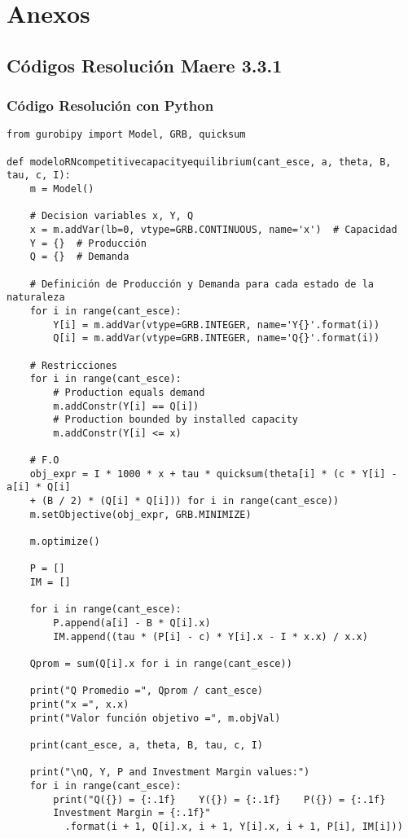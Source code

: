 
\chapter{Anexos}
\label{}

\section{Códigos Resolución Maere 3.3.1}

\subsection{Código Resolución con Python}\label{codigoPhyton}
\begin{footnotesize}
\begin{lstlisting}
from gurobipy import Model, GRB, quicksum

def modeloRNcompetitivecapacityequilibrium(cant_esce, a, theta, B, tau, c, I):
    m = Model()

    # Decision variables x, Y, Q
    x = m.addVar(lb=0, vtype=GRB.CONTINUOUS, name='x')  # Capacidad
    Y = {}  # Producción
    Q = {}  # Demanda

    # Definición de Producción y Demanda para cada estado de la naturaleza
    for i in range(cant_esce):
        Y[i] = m.addVar(vtype=GRB.INTEGER, name='Y{}'.format(i))
        Q[i] = m.addVar(vtype=GRB.INTEGER, name='Q{}'.format(i))

    # Restricciones
    for i in range(cant_esce):
        # Production equals demand
        m.addConstr(Y[i] == Q[i])
        # Production bounded by installed capacity
        m.addConstr(Y[i] <= x)

    # F.O
    obj_expr = I * 1000 * x + tau * quicksum(theta[i] * (c * Y[i] - a[i] * Q[i] 
    + (B / 2) * (Q[i] * Q[i])) for i in range(cant_esce))
    m.setObjective(obj_expr, GRB.MINIMIZE)

    m.optimize()

    P = []
    IM = []

    for i in range(cant_esce):
        P.append(a[i] - B * Q[i].x)
        IM.append((tau * (P[i] - c) * Y[i].x - I * x.x) / x.x)

    Qprom = sum(Q[i].x for i in range(cant_esce))

    print("Q Promedio =", Qprom / cant_esce)
    print("x =", x.x)
    print("Valor función objetivo =", m.objVal)

    print(cant_esce, a, theta, B, tau, c, I)

    print("\nQ, Y, P and Investment Margin values:")
    for i in range(cant_esce):
        print("Q({}) = {:.1f}    Y({}) = {:.1f}    P({}) = {:.1f}    
        Investment Margin = {:.1f}"
          .format(i + 1, Q[i].x, i + 1, Y[i].x, i + 1, P[i], IM[i]))
\end{lstlisting}
\end{footnotesize}

